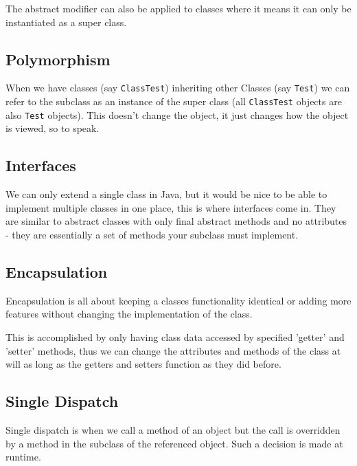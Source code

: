 \documentclass[a4paper, 12pt, twoside]{article}
\begin{document}
\vspace{\baselineskip}

The abstract modifier can also be applied to classes where it means
it can only be instantiated as a super class.

\subsection{Polymorphism}

When we have classes (say \texttt{ClassTest}) inheriting other Classes
(say \texttt{Test}) we can refer to the subclass as an instance
of the super class (all \texttt{ClassTest} objects are also
\texttt{Test} objects). This doesn't change the object, it just changes
how the object is viewed, so to speak.

\subsection{Interfaces}

We can only extend a single class in Java, but it would be nice to
be able to implement multiple classes in one place, this is where
interfaces come in. They are similar to abstract classes with
only final abstract methods and no attributes - they are essentially
a set of methods your subclass must implement.

\subsection{Encapsulation}

Encapsulation is all about keeping a classes functionality identical
or adding more features without changing the implementation of the
class. 

\vspace{\baselineskip}

This is accomplished by only having class data accessed by
specified 'getter' and 'setter' methods, thus we can change the
attributes and methods of the class at will as long as the
getters and setters function as they did before.

\subsection{Single Dispatch}

Single dispatch is when we call a method of an object but the call is
overridden by a method in the subclass of the referenced object.
Such a decision is made at runtime.
\end{document}
